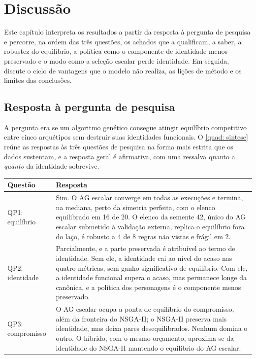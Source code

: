 \chapter[Discussão]{Discussão}
\label{chap: discussao}

Este capítulo interpreta os resultados a partir da resposta à pergunta de pesquisa e percorre, na ordem das três questões, os achados que a qualificam, a saber, a robustez do equilíbrio, a política como o componente de identidade menos preservado e o modo como a seleção escalar perde identidade. Em seguida, discute o ciclo de vantagens que o modelo não realiza, as lições de método e os limites das conclusões.

\section{Resposta à pergunta de pesquisa}
\label{sec: disc_resposta}

A pergunta era se um algoritmo genético consegue atingir equilíbrio competitivo entre cinco arquétipos sem destruir suas identidades funcionais. O \autoref{quad: sintese} reúne as respostas às três questões de pesquisa na forma mais estrita que os dados sustentam, e a resposta geral é afirmativa, com uma ressalva quanto a \textit{quanto} da identidade sobrevive.

\begin{quadro}[htb]
    \caption{Respostas às questões de pesquisa.}
    \label{quad: sintese}
    \centering
    \small
    \begin{tabularx}{\textwidth}{l X}
        \toprule
        \textbf{Questão} & \textbf{Resposta} \\
        \midrule
        QP1: equilíbrio & Sim. O AG escalar converge em todas as execuções e termina, na mediana, perto da simetria perfeita, com o elenco equilibrado em 16 de 20. O elenco da semente 42, único do AG escalar submetido à validação externa, replica o equilíbrio fora do laço, é robusto a 4 de 8 regras não vistas e frágil em 2. \\
        \midrule
        QP2: identidade & Parcialmente, e a parte preservada é atribuível ao termo de identidade. Sem ele, a identidade cai ao nível do acaso nas quatro métricas, sem ganho significativo de equilíbrio. Com ele, a identidade funcional supera o acaso, mas permanece longe da canônica, e a política dos personagens é o componente menos preservado. \\
        \midrule
        QP3: compromisso & O AG escalar ocupa a ponta de equilíbrio do compromisso, além da fronteira do NSGA-II; o NSGA-II preserva mais identidade, mas deixa pares desequilibrados. Nenhum domina o outro. O híbrido, com o mesmo orçamento, aproxima-se da identidade do NSGA-II mantendo o equilíbrio do AG escalar. \\
        \bottomrule
    \end{tabularx}
    \source
\end{quadro}

